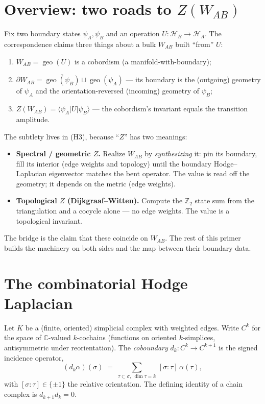 \documentclass[11pt]{article}
\theoremstyle{plain}
\theoremstyle{definition}
\theoremstyle{remark}
\newcommand{\C}{\mathbb{C}}
\newcommand{\Z}{\mathbb{Z}}
\newcommand{\HH}{\mathcal{H}}
\newcommand{\ip}[3]{\langle #1 \vert #2 \vert #3 \rangle}
\newcommand{\geo}{\operatorname{geo}}
\newcommand{\WAB}{W_{\!AB}}
\begin{document}
\section{Overview: two roads to \texorpdfstring{$Z(\WAB)$}{Z(W\_AB)}}

Fix two boundary states $\psi_A, \psi_B$ and an operation
$U:\HH_B\!\to\!\HH_A$. The correspondence claims three things about a bulk
$\WAB$ built ``from'' $U$:
\begin{enumerate}
\item[\textbf{(H1)}] $\WAB = \geo(U)$ is a cobordism (a manifold-with-boundary);
\item[\textbf{(H2)}] $\partial \WAB = \overline{\geo(\psi_B)} \sqcup \geo(\psi_A)$
  --- its boundary is the (outgoing) geometry of $\psi_A$ and the
  orientation-reversed (incoming) geometry of $\psi_B$;
\item[\textbf{(H3)}] $Z(\WAB) = \ip{\psi_A}{U}{\psi_B}$ --- the cobordism's
  invariant equals the transition amplitude.
\end{enumerate}
The subtlety lives in (H3), because ``$Z$'' has two meanings:
\begin{itemize}
\item \textbf{Spectral / geometric $Z$.} Realize $\WAB$ by \emph{synthesizing}
  it: pin its boundary, fill its interior (edge weights and topology) until the
  boundary Hodge--Laplacian eigenvector matches the bent operator. The value is
  read off the geometry; it depends on the metric (edge weights).
\item \textbf{Topological $Z$ (Dijkgraaf--Witten).} Compute the $\Z_2$ state sum
  from the triangulation and a cocycle alone --- no edge weights. The value is a
  topological invariant.
\end{itemize}
The bridge is the claim that these coincide on $\WAB$. The rest of this primer
builds the machinery on both sides and the map between their boundary data.

\section{The combinatorial Hodge Laplacian}

Let $K$ be a (finite, oriented) simplicial complex with weighted edges. Write
$C^k$ for the space of $\C$-valued $k$-cochains (functions on oriented
$k$-simplices, antisymmetric under reorientation). The \emph{coboundary}
$d_k : C^k \to C^{k+1}$ is the signed incidence operator,
\begin{equation}
(d_k \alpha)(\sigma) \;=\; \sum_{\tau \subset \sigma,\ \dim\tau = k}
\,[\sigma : \tau]\,\alpha(\tau),
\end{equation}
with $[\sigma:\tau]\in\{\pm1\}$ the relative orientation. The defining identity
of a chain complex is $d_{k+1} d_k = 0$.
\end{document}
